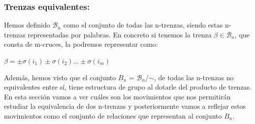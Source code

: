 \documentclass[14pt]{extarticle}
\begin{document}
\bigskip
	\subsubsection{Trenzas equivalentes:}\label{trenzasequi}
	
	Hemos definido $\mathscr{B}_{n}$ como el conjunto de todas las n-trenzas, siendo estas n-trenzas representadas por palabras. En concreto si tenemos la trenza $\beta \in \mathscr{B}_{n}$, que consta de m-cruces, la podremos representar como:
    \begin{center}
		$\beta = \pm \sigma(i_{1}) \pm \sigma(i_{2}) ... \pm \sigma(i_{m}) $
    \end{center}
	
	Además, hemos visto que el conjunto $B_{n} $ = $\mathscr{B}_{n}$/$ \sim $, de todas las n-trenzas no equivalentes entre sí, tiene estructura de grupo al dotarle del producto de trenzas.\\
	
	En esta sección vamos a ver cuáles son los movimientos que nos permitirán estudiar la equivalencia de dos n-trenzas y posteriormente vamos a reflejar estos movimientos como el conjunto de relaciones que representan al conjunto $B_{n}$.\\
	
\end{document}
